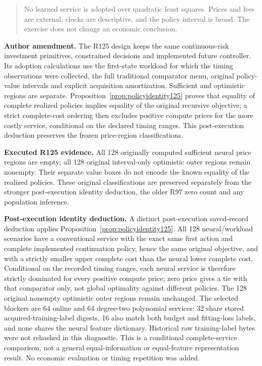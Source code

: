 \begin{quote}\small
No learned service is adopted over quadratic least squares. Prices and fees are external, clocks are descriptive, and the policy interval is broad. The exercise does not change an economic conclusion.
\end{quote}

\noindent\textbf{Author amendment.} The R125 design keeps the same continuous-risk investment primitives, constrained decisions and implemented future controller. Its adoption calculations use the first-state workload for which the timing observations were collected, the full traditional comparator menu, original policy-value intervals and explicit acquisition amortization. Sufficient and optimistic regions are separate. Proposition~\ref{prop:policyidentity125} proves that equality of complete realized policies implies equality of the original recursive objective; a strict complete-cost ordering then excludes positive compute prices for the more costly service, conditional on the declared timing ranges. This post-execution deduction preserves the frozen price-region classifications.

\noindent\textbf{Executed R125 evidence.} All 128 originally computed sufficient neural price regions are empty; all 128 original interval-only optimistic outer regions remain nonempty. Their separate value boxes do not encode the known equality of the realized policies. These original classifications are preserved separately from the stronger post-execution identity deduction, the older R97 zero count and any population inference.

\noindent\textbf{Post-execution identity deduction.} A distinct post-execution saved-record deduction applies Proposition~\ref{prop:policyidentity125}. All 128 neural/workload scenarios have a conventional service with the exact same first action and complete implemented continuation policy, hence the same original objective, and with a strictly smaller upper complete cost than the neural lower complete cost. Conditional on the recorded timing ranges, each neural service is therefore strictly dominated for every positive compute price; zero price gives a tie with that comparator only, not global optimality against different policies. The 128 original nonempty optimistic outer regions remain unchanged. The selected blockers are 64 online and 64 degree-two polynomial services: 32 share stored acquired-training-label digests, 16 also match both budget and fitting-loss labels, and none shares the neural feature dictionary. Historical raw training-label bytes were not rehashed in this diagnostic. This is a conditional complete-service comparison, not a general equal-information or equal-feature representation result. No economic evaluation or timing repetition was added.

